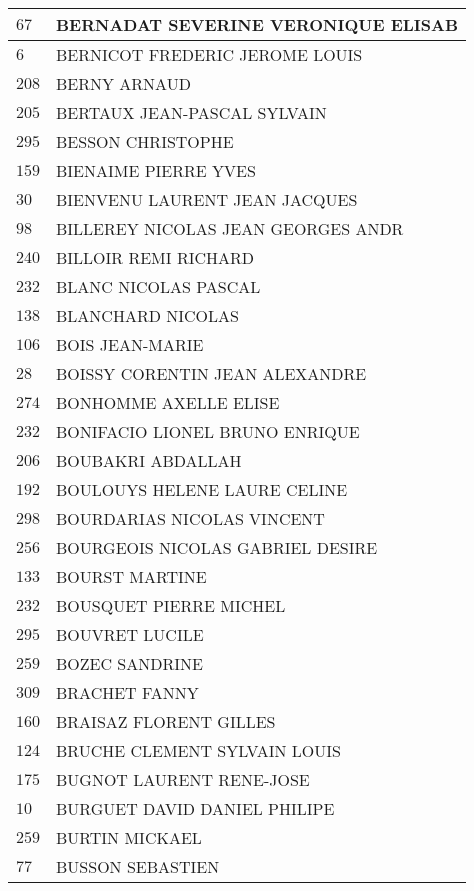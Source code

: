 \begin{xltabular}{\linewidth}{|l|X|}
    \hline
    $67$ & BERNADAT SEVERINE VERONIQUE ELISAB \\
    \hline
    $6$ & BERNICOT FREDERIC JEROME LOUIS \\
    \hline
    $208$ & BERNY ARNAUD \\
    \hline
    $205$ & BERTAUX JEAN-PASCAL SYLVAIN \\
    \hline
    $295$ & BESSON CHRISTOPHE \\
    \hline
    $159$ & BIENAIME PIERRE YVES \\
    \hline
    $30$ & BIENVENU LAURENT JEAN JACQUES \\
    \hline
    $98$ & BILLEREY NICOLAS JEAN GEORGES ANDR \\
    \hline
    $240$ & BILLOIR REMI RICHARD \\
    \hline
    $232$ & BLANC NICOLAS PASCAL \\
    \hline
    $138$ & BLANCHARD NICOLAS \\
    \hline
    $106$ & BOIS JEAN-MARIE \\
    \hline
    $28$ & BOISSY CORENTIN JEAN ALEXANDRE \\
    \hline
    $274$ & BONHOMME AXELLE ELISE \\
    \hline
    $232$ & BONIFACIO LIONEL BRUNO ENRIQUE \\
    \hline
    $206$ & BOUBAKRI ABDALLAH \\
    \hline
    $192$ & BOULOUYS HELENE LAURE CELINE \\
    \hline
    $298$ & BOURDARIAS NICOLAS VINCENT \\
    \hline
    $256$ & BOURGEOIS NICOLAS GABRIEL DESIRE \\
    \hline
    $133$ & BOURST MARTINE \\
    \hline
    $232$ & BOUSQUET PIERRE MICHEL \\
    \hline
    $295$ & BOUVRET LUCILE \\
    \hline
    $259$ & BOZEC SANDRINE \\
    \hline
    $309$ & BRACHET FANNY \\
    \hline
    $160$ & BRAISAZ FLORENT GILLES \\
    \hline
    $124$ & BRUCHE CLEMENT SYLVAIN LOUIS \\
    \hline
    $175$ & BUGNOT LAURENT RENE-JOSE \\
    \hline
    $10$ & BURGUET DAVID DANIEL PHILIPE \\
    \hline
    $259$ & BURTIN MICKAEL \\
    \hline
    $77$ & BUSSON SEBASTIEN \\

\end{xltabular}
